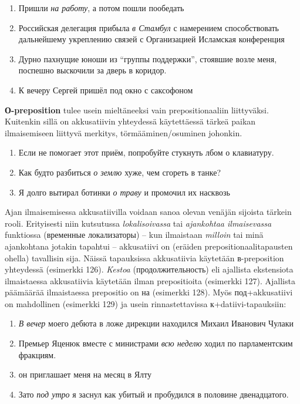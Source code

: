 \documentclass[]{scrartcl}
\providecommand{\tightlist}{%
  \setlength{\itemsep}{0pt}\setlength{\parskip}{0pt}}
\begin{document}
\begin{enumerate}
\def\labelenumi{(\arabic{enumi})}
\setcounter{enumi}{118}
\tightlist
\item
  Пришли \emph{на работу}, а потом пошли пообедать
\item
  Российская делегация прибыла \emph{в Стамбул} с намерением
  способствовать дальнейшему укреплению связей с Организацией Исламская
  конференция
\item
  Дурно пахнущие юноши из ``группы поддержки'', стоявшие возле меня,
  поспешно выскочили за дверь в коридор.
\item
  К вечеру Сергей пришёл под окно с саксофоном
\end{enumerate}

\textbf{О-preposition} tulee usein mieltäneeksi vain prepositionaaliin
liittyväksi. Kuitenkin sillä on akkusatiivin yhteydessä käytettäessä
tärkeä paikan ilmaisemiseen liittyvä merkitys, törmääminen/osuminen
johonkin.

\begin{enumerate}
\def\labelenumi{(\arabic{enumi})}
\setcounter{enumi}{122}
\tightlist
\item
  Если не помогает этот приём, попробуйте стукнуть лбом о клавиатуру.
\item
  Как будто разбиться \emph{о землю} хуже, чем сгореть в танке?
\item
  Я долго вытирал ботинки \emph{о траву} и промочил их насквозь
\end{enumerate}

Ajan ilmaisemisessa akkusatiivilla voidaan sanoa olevan venäjän sijoista
tärkein rooli. Erityisesti niin kutsutussa \emph{lokalisoivassa} tai
\emph{ajankohtaa ilmaisevassa} funktiossa (временные локализаторы) --
kun ilmaistaan \emph{milloin} tai minä ajankohtana jotakin tapahtui --
akkusatiivi on (eräiden prepositionaalitapausten ohella) tavallisin
sija. Näissä tapauksissa akkusatiivia käytetään в-preposition yhteydessä
(esimerkki 126). \emph{Kestoa} (продолжительность) eli ajallista
ekstensiota ilmaistaessa akkusatiivia käytetään ilman prepositioita
(esimerkki 127). Ajallista päämäärää ilmaistaessa prepositio on на
(esimerkki 128). Myös под+akkusatiivi on mahdollinen (esimerkki 129) ja
usein rinnastettavissa к+datiivi-tapauksiin:

\begin{enumerate}
\def\labelenumi{(\arabic{enumi})}
\setcounter{enumi}{125}
\tightlist
\item
  \emph{В вечер} моего дебюта в ложе дирекции находился Михаил Иванович
  Чулаки
\item
  Премьер Яценюк вместе с министрами \emph{всю неделю} ходил по
  парламентским фракциям.
\item
  он приглашает меня на месяц в Ялту
\item
  Зато \emph{под утро} я заснул как убитый и пробудился в половине
  двенадцатого.
\end{enumerate}
\end{document}
